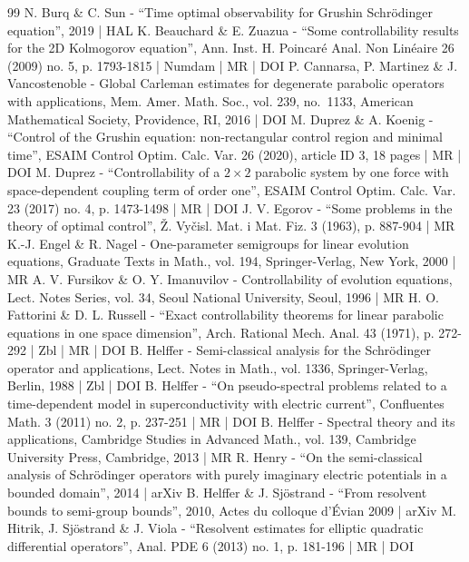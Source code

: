\begin{thebibliography}{99}
N. Burq \& C. Sun - “Time optimal observability for Grushin Schrödinger equation”, 2019 | HAL
K. Beauchard \& E. Zuazua - “Some controllability results for the 2D Kolmogorov equation”, Ann. Inst. H. Poincaré Anal. Non Linéaire 26 (2009) no. 5, p. 1793-1815 | Numdam | MR | DOI
P. Cannarsa, P. Martinez \& J. Vancostenoble - Global Carleman estimates for degenerate parabolic operators with applications, Mem. Amer. Math. Soc., vol. 239, no. 1133, American Mathematical Society, Providence, RI, 2016 | DOI
M. Duprez \& A. Koenig - “Control of the Grushin equation: non-rectangular control region and minimal time”, ESAIM Control Optim. Calc. Var. 26 (2020), article ID 3, 18 pages | MR | DOI
M. Duprez - “Controllability of a $2\times 2$ parabolic system by one force with space-dependent coupling term of order one”, ESAIM Control Optim. Calc. Var. 23 (2017) no. 4, p. 1473-1498 | MR | DOI
J. V. Egorov - “Some problems in the theory of optimal control”, Ž. Vyčisl. Mat. i Mat. Fiz. 3 (1963), p. 887-904 | MR
K.-J. Engel \& R. Nagel - One-parameter semigroups for linear evolution equations, Graduate Texts in Math., vol. 194, Springer-Verlag, New York, 2000 | MR
A. V. Fursikov \& O. Y. Imanuvilov - Controllability of evolution equations, Lect. Notes Series, vol. 34, Seoul National University, Seoul, 1996 | MR
H. O. Fattorini \& D. L. Russell - “Exact controllability theorems for linear parabolic equations in one space dimension”, Arch. Rational Mech. Anal. 43 (1971), p. 272-292 | Zbl | MR | DOI
B. Helffer - Semi-classical analysis for the Schrödinger operator and applications, Lect. Notes in Math., vol. 1336, Springer-Verlag, Berlin, 1988 | Zbl | DOI
B. Helffer - “On pseudo-spectral problems related to a time-dependent model in superconductivity with electric current”, Confluentes Math. 3 (2011) no. 2, p. 237-251 | MR | DOI
B. Helffer - Spectral theory and its applications, Cambridge Studies in Advanced Math., vol. 139, Cambridge University Press, Cambridge, 2013 | MR
R. Henry - “On the semi-classical analysis of Schrödinger operators with purely imaginary electric potentials in a bounded domain”, 2014 | arXiv
B. Helffer \& J. Sjöstrand - “From resolvent bounds to semi-group bounds”, 2010, Actes du colloque d’Évian 2009 | arXiv
M. Hitrik, J. Sjöstrand \& J. Viola - “Resolvent estimates for elliptic quadratic differential operators”, Anal. PDE 6 (2013) no. 1, p. 181-196 | MR | DOI

\end{thebibliography}
